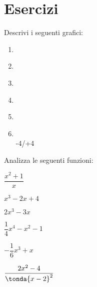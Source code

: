 
\section{Esercizi}

% 

\newcommand{\myp}{~\\ [-1.5em]} %


\begin{esercizio}\label{ese:stufun.1g}
Descrivi i seguenti grafici:

\begin{multicols}{2}
\begin{enumerate} [left=0pt, label=\alph*)]
\item \myp 
{} %
\item \myp 
{}%
\item \myp 
{} %
\item \myp 
{} %
\item \myp 
{} %
\item \myp 
{} {-4/+4}%
\end{enumerate}
\end{multicols}
\end{esercizio}

\begin{esercizio}\label{ese:stufun.1e}
Analizza le seguenti funzioni:
\begin{multicols}{3}
 \begin{enumeratea}
  \item \(\dfrac{x^2 +1}{x}\) %
  \item \(x^3-2x+4\) %
  \item \(2x^3-3x\) %
  \item \(\dfrac{1}{4}x^4-x^2-1\) %
  \item \(-\dfrac{1}{6}x^3+x\) %
  \item \(\dfrac{2x^2-4}{\tonda{x-2}^2}\) %
 \end{enumeratea}
\end{multicols}
\end{esercizio}

